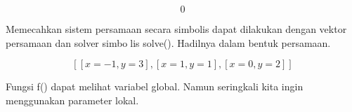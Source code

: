 \documentclass[a4paper,10pt]{article}
\begin{document}
\begin{eulernotebook}
\begin{eulercomment}
\begin{eulercomment}
\begin{eulerprompt}
\end{eulerprompt}
\begin{eulerformula}
\[
0
\]
\end{eulerformula}
\begin{eulercomment}
Memecahkan sistem persamaan secara simbolis dapat dilakukan dengan
vektor persamaan dan solver simbolis solve(). Hadilnya dalam bentuk
persamaan.
\end{eulercomment}
\begin{eulerformula}
\[
\left[ \left[ x=-1 , y=3 \right]  , \left[ x=1 , y=1 \right]  ,   \left[ x=0 , y=2 \right]  \right] 
\]
\end{eulerformula}
\begin{eulercomment}
Fungsi f() dapat melihat variabel global. Namun seringkali kita ingin
menggunakan parameter lokal.


\end{eulercomment}
\end{eulercomment}
\end{eulercomment}
\end{eulernotebook}
\end{document}
